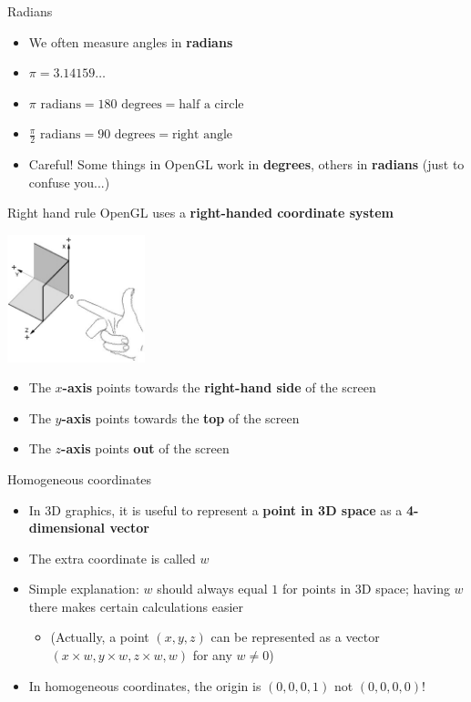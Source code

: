 \begin{frame}{Radians}
	\begin{itemize}
		\pause\item We often measure angles in \textbf{radians}
		\pause\item $\pi = 3.14159\dots$ 
		\pause\item $\pi \text{ radians} = 180 \text{ degrees} = \text{half a circle}$ 
		\pause\item $\frac{\pi}{2} \text{ radians} = 90 \text{ degrees} = \text{right angle}$
		\pause\item Careful! Some things in OpenGL work in \textbf{degrees}, others in \textbf{radians}
			(just to confuse you...)
	\end{itemize}
\end{frame}

\begin{frame}{Right hand rule}
	\pause OpenGL uses a \textbf{right-handed coordinate system}
	\pause \begin{center}
		\includegraphics[width=0.3\textwidth]{RightHandRule}
	\end{center}
	\begin{itemize}
		\pause\item The \textbf{$x$-axis} points towards the \textbf{right-hand side} of the screen
		\pause\item The \textbf{$y$-axis} points towards the \textbf{top} of the screen
		\pause\item The \textbf{$z$-axis} points \textbf{out} of the screen
	\end{itemize}
\end{frame}

\begin{frame}{Homogeneous coordinates}
	\begin{itemize}
		\pause\item In 3D graphics, it is useful to represent a \textbf{point in 3D space} as a \textbf{4-dimensional vector}
		\pause\item The extra coordinate is called $w$
		\pause\item Simple explanation: $w$ should always equal $1$ for points in 3D space; having $w$ there makes certain calculations easier
			\begin{itemize}
				\pause\item (Actually, a point $(x,y,z)$ can be represented as a vector $(x \times w, y \times w, z \times w, w)$ for any $w \neq 0$)
			\end{itemize}
		\pause\item In homogeneous coordinates, the origin is $(0, 0, 0, 1)$ not $(0, 0, 0, 0)$!
	\end{itemize}
\end{frame}
